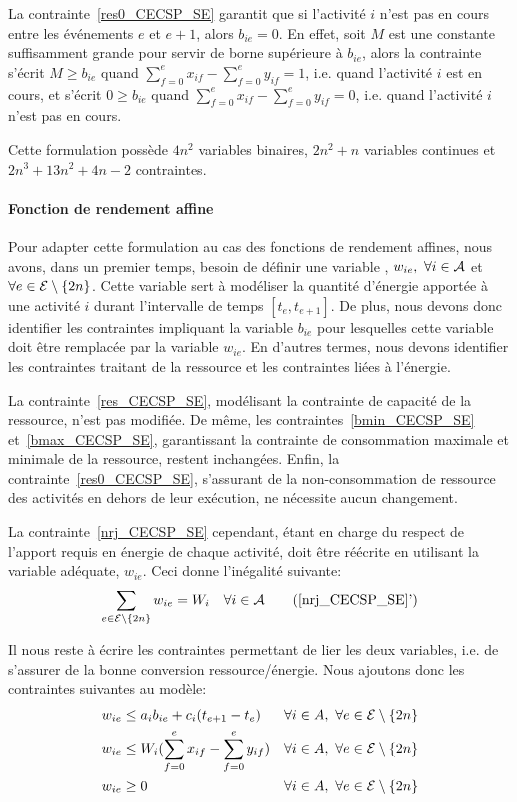 La contrainte~\eqref{res0_CECSP_SE} garantit que si l'activité $i$
n'est pas en cours entre les événements $e$ et $e+1$, alors
$b_{ie}=0$. En effet, soit $M$ est une constante suffisamment grande
pour servir de borne supérieure à $b_{ie}$, alors la contrainte
s'écrit $M\ge b_{ie}$ quand $\sum_{f=0}^{e} x_{if}
-\sum_{f=0}^{e}y_{if}=1$, i.e. quand l'activité $i$ est en cours, et
s'écrit $0\ge b_{ie}$ quand $\sum_{f=0}^{e}
x_{if}-\sum_{f=0}^{e}y_{if}=0$, i.e. quand l'activité $i$ n'est pas en
cours.

Cette formulation possède $4n^2$ variables binaires, $2n^2+n$
variables continues et $2n^3+13n^2+4n-2$ contraintes.

\paragraph{Fonction de rendement affine}

Pour adapter cette formulation au cas des fonctions de rendement
affines, nous avons, dans un premier temps, besoin de définir une
variable , $w_{ie},\ \forall i \in {\cal A}$ et $\forall e \in
{\cal E}\setminus\{2n\}$. Cette variable sert à modéliser la quantité
d'énergie apportée à une activité $i$ durant l'intervalle de temps
$[t_e,t_{e+1}]$. De plus, nous devons donc
identifier les contraintes impliquant la variable $b_{ie}$ pour
lesquelles cette variable doit être remplacée par la variable
$w_{ie}$. En d'autres termes, nous devons identifier les contraintes
traitant de la ressource et les contraintes liées à l'énergie.

La contrainte~\eqref{res_CECSP_SE}, modélisant la contrainte de
capacité de la ressource, n'est pas modifiée. De même, les
contraintes~\eqref{bmin_CECSP_SE} et~\eqref{bmax_CECSP_SE},
garantissant la contrainte de consommation maximale et minimale de la
ressource, restent inchangées. Enfin, la
contrainte~\eqref{res0_CECSP_SE}, s'assurant de la non-consommation de
ressource des activités en dehors de leur exécution, ne nécessite
aucun changement.

La contrainte~\eqref{nrj_CECSP_SE} cependant, étant en charge du
respect de l'apport requis en énergie de chaque activité, doit être
réécrite en utilisant la variable adéquate, $w_{ie}$. Ceci donne
l'inégalité suivante:
\begin{equation} 
\sum_{e\in \E\setminus\{2n\}} w_{ie} = W_i\quad \forall i \in \A
\tag{\ref{nrj_CECSP_SE}'}
\label{nrj2_CECSP_SE}
\end{equation} 

Il nous reste à écrire les contraintes permettant de lier les deux
variables, i.e.  de s'assurer de la bonne conversion
ressource/énergie. Nous ajoutons donc les contraintes suivantes au
modèle:
\begin{align}
  &w_{ie} \le a_ib_{ie}+c_i(t_{e+1}-t_e) & & \forall i \in A,\ \forall
  e \in {\cal E} \setminus\{2n\} \label{conv1_CECSP_SE}\\
     &w_{ie} \le W_i (\sum_{f=0}^{e} x_{if} -\sum_{f=0}^{e} y_{if}) &
    & \forall i \in A,\ \forall e \in {\cal
      E}\setminus\{2n\} \label{conv2_CECSP_SE}\\
& w_{ie} \ge 0 & & \forall i \in A,\ \forall e \in {\cal
      E}\setminus\{2n\}
\label{Bw_CECSP_SE}
\end{align}

